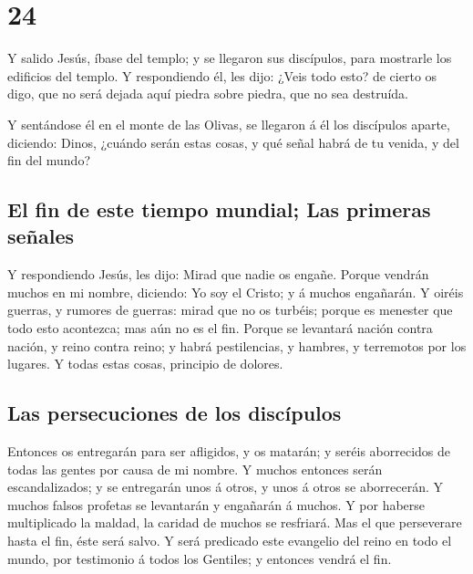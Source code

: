 \hypertarget{section-23}{%
\section{24}\label{section-23}}

 Y salido Jesús, íbase del templo; y se llegaron sus
discípulos, para mostrarle los edificios del templo.  Y
respondiendo él, les dijo: ¿Veis todo esto? de cierto os digo, que no
será dejada aquí piedra sobre piedra, que no sea destruída.

 Y sentándose él en el monte de las Olivas, se llegaron á
él los discípulos aparte, diciendo: Dinos, ¿cuándo serán estas cosas, y
qué señal habrá de tu venida, y del fin del mundo?

\hypertarget{el-fin-de-este-tiempo-mundial-las-primeras-seuxf1ales}{%
\subsection{El fin de este tiempo mundial; Las primeras
señales}\label{el-fin-de-este-tiempo-mundial-las-primeras-seuxf1ales}}

 Y respondiendo Jesús, les dijo: Mirad que nadie os
engañe.  Porque vendrán muchos en mi nombre, diciendo: Yo
soy el Cristo; y á muchos engañarán.  Y oiréis guerras, y
rumores de guerras: mirad que no os turbéis; porque es menester que todo
esto acontezca; mas aún no es el fin.  Porque se levantará
nación contra nación, y reino contra reino; y habrá pestilencias, y
hambres, y terremotos por los lugares.  Y todas estas
cosas, principio de dolores.

\hypertarget{las-persecuciones-de-los-discuxedpulos}{%
\subsection{Las persecuciones de los
discípulos}\label{las-persecuciones-de-los-discuxedpulos}}

 Entonces os entregarán para ser afligidos, y os matarán;
y seréis aborrecidos de todas las gentes por causa de mi nombre.
 Y muchos entonces serán escandalizados; y se entregarán
unos á otros, y unos á otros se aborrecerán.  Y muchos
falsos profetas se levantarán y engañarán á muchos.  Y
por haberse multiplicado la maldad, la caridad de muchos se resfriará.
 Mas el que perseverare hasta el fin, éste será salvo.
 Y será predicado este evangelio del reino en todo el
mundo, por testimonio á todos los Gentiles; y entonces vendrá el fin.

